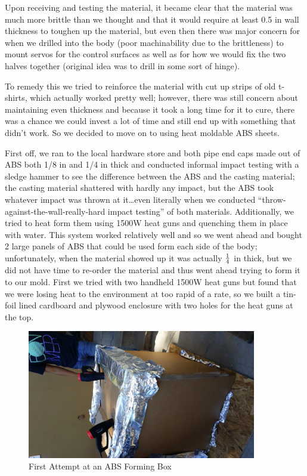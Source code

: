 \documentclass{report}
\begin{document}
Upon receiving and testing the material, it became clear that the material was much more brittle than we thought and that it would require at least 0.5 in wall thickness to toughen up the material, but even then there was major concern for when we drilled into the body (poor machinability due to the brittleness) to mount servos for the control surfaces as well as for how we would fix the two halves together (original idea was to drill in some sort of hinge).\par
To remedy this we tried to reinforce the material with cut up strips of old t-shirts, which actually worked pretty well; however, there was still concern about maintaining even thickness and because it took a long time for it to cure, there was a chance we could invest a lot of time and still end up with something that didn’t work.  So we decided to move on to using heat moldable ABS sheets.\par
First off, we ran to the local hardware store and both pipe end caps made out of ABS both 1/8 in and 1/4 in thick and conducted informal impact testing with a sledge hammer to see the difference between the ABS and the casting material; the casting material shattered with hardly any impact, but the ABS took whatever impact was thrown at it…even literally when we conducted “throw-against-the-wall-really-hard impact testing” of both materials.  Additionally, we tried to heat form them using 1500W heat guns and quenching them in place with water.  This system worked relatively well and so we went ahead and bought 2 large panels of ABS that could be used form each side of the body; unfortunately, when the material showed up it was actually $1\over4$ in thick, but we did not have time to re-order the material and thus went ahead trying to form it to our mold.  First we tried with two handheld 1500W heat guns but found that we were losing heat to the environment at too rapid of a rate, so we built a tin-foil lined cardboard and plywood enclosure with two holes for the heat guns at the top.\par
\begin{figure}[H]
\centering
\includegraphics[width=10cm]{hotbox}
\caption{First Attempt at an ABS Forming Box}
\end{figure}
\end{document}
